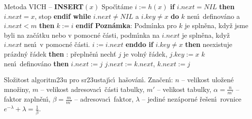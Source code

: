 \documentclass[a4paper,12pt]{article}
\begin{document}
\flushpar Metoda VICH -- {\bf INSERT$(x)$}\newline 
Spo\v c\'\i t\'ame $i:=h(x)$\newline 
{\bf if} $i.next=NIL$ {\bf then} $i.next=x$, stop {\bf endif\newline 
while} $i.next\ne NIL$ a $i.key\ne x$ {\bf do}\newline 
\phantom{---}{\bf if} $k$ nen\'\i\ definov\'ano a $i.next<m$ {\bf then} $k:=i$ {\bf endif\newline 
Pozn\'amka}: Podm\'\i nka pro $k$ je spln\v ena, kdy\v z jsme byli na 
za\v c\'atku nebo v pomocn\'e \v c\'asti, podm\'\i nka na $i.next$ je 
spln\v ena, kdy\v z $i.next$ nen\'\i\ v pomocn\'e \v c\'asti.\newline 
\phantom{---}$i:=i.next$\newline 
{\bf enddo\newline 
if} $i.key\ne x$ {\bf then}\newline 
\phantom{---}{\bf if} neexistuje pr\'azdn\'y \v r\'adek {\bf then}\newline 
\phantom{------}{\bf V\'ystup}: p\v repln\v en\'\i\newline 
\phantom{---}{\bf else}\newline 
\phantom{------}nech\v t $j$ je voln\'y \v r\'adek, $j.key:=x$\newline 
\phantom{------}{\bf if} $k$ nen\'\i\ definov\'ano {\bf then}\newline 
\phantom{---------}$i.next:=j$\newline 
\phantom{------}{\bf else}\newline 
\phantom{---------}$j.next:=k.next$, $k.next:=j$\newline 
\phantom{------}{\bf endif}\newline 
\phantom{---}{\bf endif\newline 
endif}
\bigskip

\flushpar Slo\v zitost algoritm\accent23u pro sr\accent23ustaj\'\i c\'\i\ ha\v sov\'an\'\i .\newline 
Zna\v cen\'\i : $n$ -- velikost ulo\v zen\'e mno\v ziny,\newline 
$m$ -- velikost adresovac\'\i\ \v c\'asti tabulky,\newline 
$m'$ -- velikost tabulky,\newline 
$\alpha =\frac n{m'}$ -- faktor zapln\v en\'\i ,\newline 
$\beta =\frac m{m'}$ -- adresovac\'\i\ faktor,\newline 
$\lambda$ -- jedin\'e nez\'aporn\'e \v re\v sen\'\i\ rovnice $e^{
-\lambda}+\lambda =\frac 1{\beta}$.
\medskip
\end{document}
